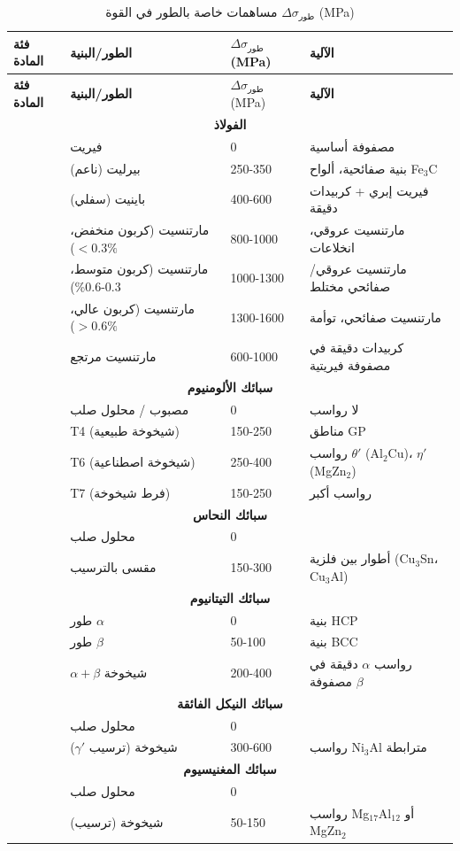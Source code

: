 \documentclass[12pt,a4paper]{article}
\begin{document}
	\begin{longtable}{p{3.5cm} p{3.0cm} p{3.0cm} p{4cm}}
		\caption{مساهمات خاصة بالطور في القوة \(\Delta\sigma_{\text{طور}}\) (MPa)}\label{tab:phase_contrib}\\
		\toprule
		\textbf{فئة المادة} & \textbf{الطور/البنية} & \(\Delta\sigma_{\text{طور}}\) (MPa) & \textbf{الآلية} \\
		\midrule
		\endfirsthead
		\toprule
		\textbf{فئة المادة} & \textbf{الطور/البنية} & \(\Delta\sigma_{\text{طور}}\) (MPa) & \textbf{الآلية} \\
		\midrule
		\endhead
		\multicolumn{4}{c}{\textbf{الفولاذ}} \\
		& فيريت & 0 & مصفوفة أساسية \\
		& بيرليت (ناعم) & 250-350 & بنية صفائحية، ألواح Fe\(_3\)C \\
		& باينيت (سفلي) & 400-600 & فيريت إبري + كربيدات دقيقة \\
		& مارتنسيت (كربون منخفض، \(<0.3\%\)) & 800-1000 & مارتنسيت عروقي، انخلاعات \\
		& مارتنسيت (كربون متوسط، 0.3-0.6\%) & 1000-1300 & مارتنسيت عروقي/صفائحي مختلط \\
		& مارتنسيت (كربون عالي، \(>0.6\%\)) & 1300-1600 & مارتنسيت صفائحي، توأمة \\
		& مارتنسيت مرتجع & 600-1000 & كربيدات دقيقة في مصفوفة فيريتية \\
		\hline
		\multicolumn{4}{c}{\textbf{سبائك الألومنيوم}} \\
		& مصبوب / محلول صلب & 0 & لا رواسب \\
		& T4 (شيخوخة طبيعية) & 150-250 & مناطق GP \\
		& T6 (شيخوخة اصطناعية) & 250-400 & رواسب \(\theta'\) (Al\(_2\)Cu)، \(\eta'\) (MgZn\(_2\)) \\
		& T7 (فرط شيخوخة) & 150-250 & رواسب أكبر \\
		\hline
		\multicolumn{4}{c}{\textbf{سبائك النحاس}} \\
		& محلول صلب & 0 & \\
		& مقسى بالترسيب & 150-300 & أطوار بين فلزية (Cu\(_3\)Sn، Cu\(_3\)Al) \\
		\hline
		\multicolumn{4}{c}{\textbf{سبائك التيتانيوم}} \\
		& طور \(\alpha\) & 0 & بنية HCP \\
		& طور \(\beta\) & 50-100 & بنية BCC \\
		& \(\alpha+\beta\) شيخوخة & 200-400 & رواسب \(\alpha\) دقيقة في مصفوفة \(\beta\) \\
		\hline
		\multicolumn{4}{c}{\textbf{سبائك النيكل الفائقة}} \\
		& محلول صلب & 0 & \\
		& شيخوخة (ترسيب \(\gamma'\)) & 300-600 & رواسب Ni\(_3\)Al مترابطة \\
		\hline
		\multicolumn{4}{c}{\textbf{سبائك المغنيسيوم}} \\
		& محلول صلب & 0 & \\
		& شيخوخة (ترسيب) & 50-150 & رواسب Mg\(_{17}\)Al\(_{12}\) أو MgZn\(_2\) \\
		\bottomrule
	\end{longtable}
	
\end{document}
